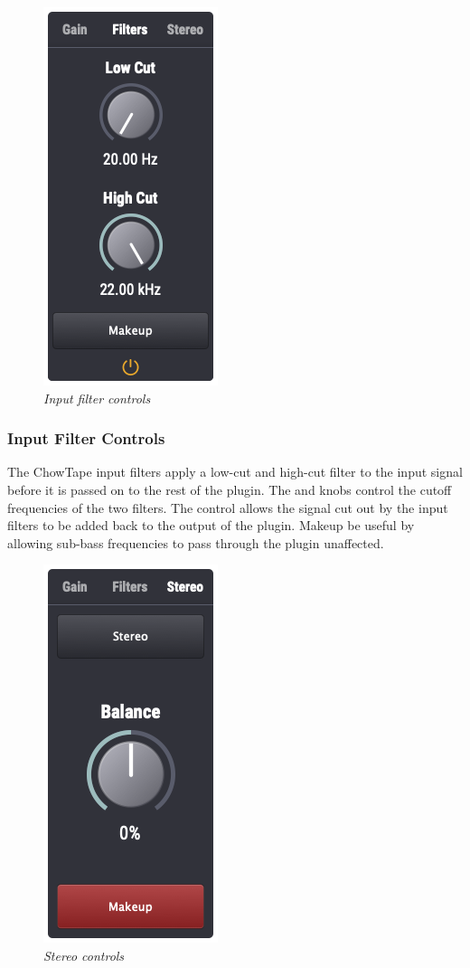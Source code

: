 \documentclass[landscape,twocolumn,a5paper]{manual}
\begin{document}
\begin{figure}[ht]
    \center
    \includegraphics[height=0.32\paperheight]{../Plugin/Screenshots/Filters.png}
    \caption{\label{h_inputs}{\it Input filter controls}}
\end{figure}

\subsubsection{Input Filter Controls}
The ChowTape input filters apply a low-cut and high-cut filter
to the input signal before it is passed on to the rest of the
plugin. The  and  knobs
control the cutoff frequencies of the two filters. The
 control allows the signal cut out by the
input filters to be added back to the output of the plugin.
Makeup be useful by allowing sub-bass frequencies to pass
through the plugin unaffected.

\begin{figure}[ht]
    \center
    \includegraphics[height=0.32\paperheight]{../Plugin/Screenshots/Stereo.png}
    \caption{\label{h_inputs}{\it Stereo controls}}
\end{figure}
\end{document}
